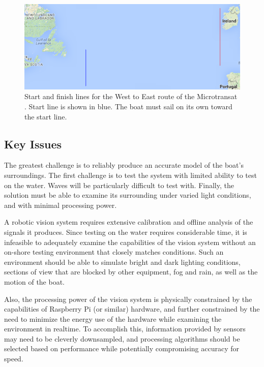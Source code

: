 \begin{figure}
\includegraphics[width=150mm,natwidth=667,natheight=264]{"./image/start-finish_map"}
\caption[Microtransat keypoints.]{\label{fig:w-e_start-finish}Start and finish lines for the West to East route of the Microtransat \cite{transat__w-e_start-finish}. Start line is shown in blue. The boat must sail on its own toward the start line. }
\end{figure}

\subsection{\label{sec:intro:key-issues}Key Issues}
The greatest challenge is to reliably produce an accurate model of the boat's surroundings. The first challenge is to test the system with limited ability to test on the water.  Waves will be particularly difficult to test with.  Finally, the solution must be able to examine its surrounding under varied light conditions, and with minimal processing power.

A robotic vision system requires extensive calibration and offline analysis of the signals it produces. Since testing on the water requires considerable time, it is infeasible to adequately examine the capabilities of the vision system without an on-shore testing environment that closely matches conditions. Such an environment should be able to simulate bright and dark lighting conditions, sections of view that are blocked by other equipment, fog and rain, as well as the motion of the boat.

Also, the processing power of the vision system is physically constrained by the capabilities of Raspberry Pi (or similar) hardware, and further constrained by the need to minimize the energy use of the hardware while examining the environment in realtime. To accomplish this, information provided by sensors may need to be cleverly downsampled, and processing algorithms should be selected based on performance while potentially compromising accuracy for speed.


